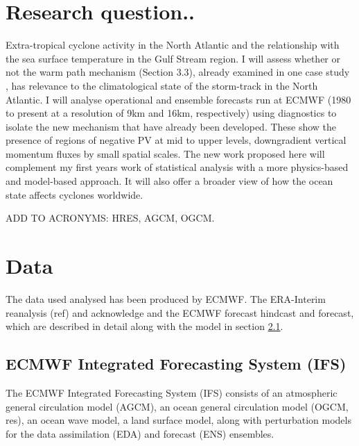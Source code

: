 \section {Research question..}
Extra-tropical cyclone activity in the North Atlantic and the relationship with the sea surface temperature in the Gulf Stream region. I will assess whether or not the warm path mechanism (Section 3.3), already examined in one case study \cite{sheldon2017warm}, has relevance to the climatological state of the storm-track in the North Atlantic. I will analyse operational and ensemble forecasts run at ECMWF (1980 to present at a resolution of 9km and 16km, respectively) using diagnostics to isolate the new mechanism that have already been developed. These show the presence of regions of negative PV at mid to upper levels, downgradient vertical momentum fluxes by small spatial scales. The new work proposed here will complement my first years work of statistical analysis with a more physics-based and model-based approach. It will also offer a broader view of how the ocean state affects cyclones worldwide. 

ADD TO ACRONYMS: HRES, AGCM, OGCM.



\section {Data}  \label{data}

The data used analysed has been produced by ECMWF. The ERA-Interim reanalysis (ref) and acknowledge and the ECMWF forecast hindcast and forecast, which are described in detail along with the model in section \ref{ECMWF_fs}.

\subsection {ECMWF Integrated Forecasting System (IFS)}  \label{ECMWF_fs}

The ECMWF Integrated Forecasting System (IFS) consists of an atmospheric general circulation model (AGCM), an ocean general circulation model (OGCM, res), an ocean wave model, a land surface model, along with perturbation models for the data assimilation (EDA) and forecast (ENS) ensembles.

